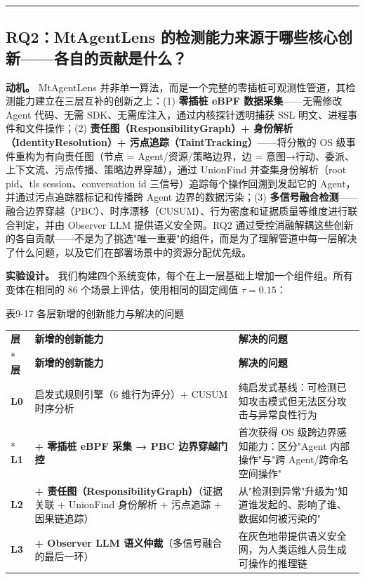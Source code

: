 \documentclass[a4paper]{ctexart}
\makeatletter
\renewcommand{\_}{%
  \ifmmode
    \nfss@text{\textunderscore}%
  \else
    \textunderscore\discretionary{}{}{}%
  \fi}
\makeatother
\begin{document}
\bigskip
\hrule
\bigskip


\subsection{RQ2：MtAgentLens 的检测能力来源于哪些核心创新——各自的贡献是什么？}



\textbf{动机。} MtAgentLens 并非单一算法，而是一个完整的零插桩可观测性管道，其检测能力建立在三层互补的创新之上：(1) \textbf{零插桩 eBPF 数据采集}——无需修改 Agent 代码、无需 SDK、无需库注入，通过内核探针透明捕获 SSL 明文、进程事件和文件操作；(2) \textbf{责任图（ResponsibilityGraph）+ 身份解析（IdentityResolution）+ 污点追踪（TaintTracking）}——将分散的 OS 级事件重构为有向责任图（节点 = Agent/资源/策略边界，边 = 意图→行动、委派、上下文流、污点传播、策略边界穿越），通过 UnionFind 并查集身份解析（root\_pid、tls\_session、conversation\_id 三信号）追踪每个操作回溯到发起它的 Agent，并通过污点追踪器标记和传播跨 Agent 边界的数据污染；(3) \textbf{多信号融合检测}——融合边界穿越（PBC）、时序漂移（CUSUM）、行为密度和证据质量等维度进行联合判定，并由 Observer LLM 提供语义安全网。RQ2 通过受控消融解耦这些创新的各自贡献——不是为了挑选"唯一重要"的组件，而是为了理解管道中每一层解决了什么问题，以及它们在部署场景中的资源分配优先级。


\textbf{实验设计。} 我们构建四个系统变体，每个在上一层基础上增加一个组件组。所有变体在相同的 86 个场景上评估，使用相同的固定阈值 $\tau = 0.15$：


\medskip
{\centering\small
表9-17 各层新增的创新能力与解决的问题\par
\vspace{3pt}
\setlength{\tabcolsep}{6pt}
\renewcommand{\arraystretch}{1.1}
\begin{longtable}{p{4.5cm} >{\raggedright\arraybackslash}p{4.5cm} >{\raggedright\arraybackslash}p{4.5cm}}
\hline
\textbf{层} & \textbf{新增的创新能力} & \textbf{解决的问题} \\*
\hline
\endfirsthead
\hline
\textbf{层} & \textbf{新增的创新能力} & \textbf{解决的问题} \\
\hline
\endhead
\hline
\endfoot
\hline
\endlastfoot
\textbf{L0} & 启发式规则引擎（6 维行为评分）+ CUSUM 时序分析 & 纯启发式基线：可检测已知攻击模式但无法区分攻击与异常良性行为 \\*
\hline
\textbf{L1} & \textbf{+ 零插桩 eBPF 采集 → PBC 边界穿越门控} & 首次获得 OS 级跨边界感知能力：区分"Agent 内部操作"与"跨 Agent/跨命名空间操作" \\
\hline
\textbf{L2} & \textbf{+ 责任图（ResponsibilityGraph）}（证据关联 + UnionFind 身份解析 + 污点追踪 + 因果链追踪） & 从"检测到异常"升级为"知道谁发起的、影响了谁、数据如何被污染的" \\
\hline
\textbf{L3} & \textbf{+ Observer LLM 语义仲裁}（多信号融合的最后一环） & 在灰色地带提供语义安全网，为人类运维人员生成可操作的推理链 \\
\hline
\end{longtable}
\par}
\end{document}
